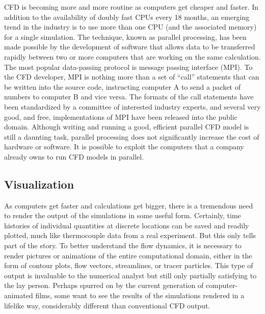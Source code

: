 \documentclass[graybox]{svmult}
\begin{document}
CFD is becoming more and more routine as computers get cheaper and faster. In addition to the availability of doubly fast CPUs every 18 months, an emerging trend in the industry is to use more than one CPU (and the associated memory) for a single simulation. The technique, known as parallel processing, has been made possible by the development of software that allows data to be transferred rapidly between two or more computers that are working on the same calculation. The most popular data-passing protocol is message passing interface (MPI). To the CFD developer, MPI is nothing more than a set of ``call'' statements that can be written into the source code, instructing computer A to send a packet of numbers to computer B and vice versa. The formats of the call statements have been standardized by a committee of interested industry experts, and several very good, and free, implementations of MPI have been released into the public domain. Although writing and running a good, efficient parallel CFD model is still a daunting task, parallel processing does not significantly increase the cost of hardware or software. It is possible to exploit the computers that a company already owns to run CFD models in parallel.

\subsection{Visualization}

As computers get faster and calculations get bigger, there is a tremendous need to render the output of the simulations in some useful form. Certainly, time histories of individual quantities at discrete locations can be saved and readily plotted, much like thermocouple data from a real experiment. But this only tells part of the story. To better understand the flow dynamics, it is necessary to render pictures or animations of the entire computational domain, either in the form of contour plots, flow vectors, streamlines, or tracer particles. This type of output is invaluable to the numerical analyst but still only partially satisfying to the lay person. Perhaps spurred on by the current generation of computer-animated films, some want to see the results of the simulations rendered in a lifelike way, considerably different than conventional CFD output.
\end{document}
